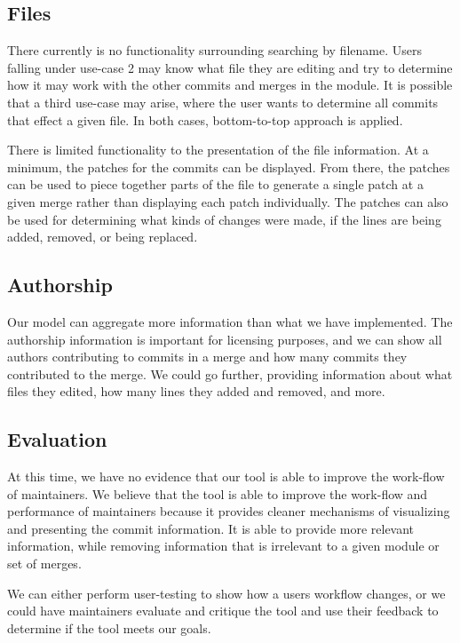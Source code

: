 \documentclass[conference, draftclsnofoot, draft]{IEEEtran}
\begin{document}
\subsection{Files}

There currently is no functionality surrounding searching by filename. Users falling
under use-case 2 may know what file they are editing and try to determine how it may
work with the other commits and merges in the module. It is possible that a third
use-case may arise, where the user wants to determine all commits that effect a
given file. In both cases, bottom-to-top approach is applied.

There is limited functionality to the presentation of the file information. At a
minimum, the patches for the commits can be displayed. From there, the patches can
be used to piece together parts of the file to generate a single patch at a given
merge rather than displaying each patch individually. The patches can also be used
for determining what kinds of changes were made, if the lines are being added,
removed, or being replaced.

\subsection{Authorship}

Our model can aggregate more information than what we have implemented. The
authorship information is important for licensing purposes, and we can show all
authors contributing to commits in a  merge and how many commits they contributed to
the merge. We could go further, providing information about what files they edited,
how many lines they added and removed, and more.

\subsection{Evaluation}

At this time, we have no evidence that our tool is able to improve the work-flow of
maintainers. We believe that the tool is able to improve the work-flow and
performance of maintainers because it provides cleaner mechanisms of visualizing and
presenting the commit information. It is able to provide more relevant information,
while removing information that is irrelevant to a given module or set of merges.

We can either perform user-testing to show how a users workflow changes, or we could
have maintainers evaluate and critique the tool and use their feedback to determine
if the tool meets our goals.
\end{document}
